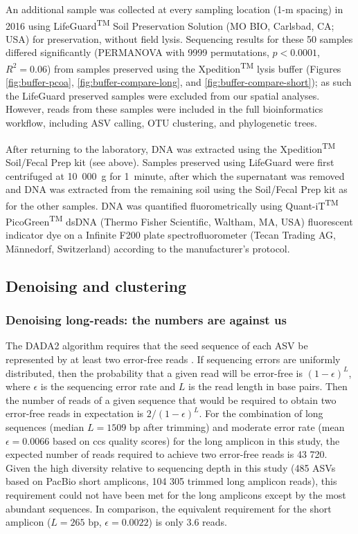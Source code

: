 \documentclass[
]{article}
\begin{document}
An additional sample was collected at every sampling location (1-m spacing) in 2016 using LifeGuard\textsuperscript{TM} Soil Preservation Solution (MO BIO, Carlsbad, CA; USA) for preservation, without field lysis.
Sequencing results for these 50 samples differed significantly (PERMANOVA with 9999 permutations, \(p < 0.0001\), \(R^2 = 0.06\)) from samples preserved using the Xpedition\textsuperscript{TM} lysis buffer (Figures \ref{fig:buffer-pcoa}, \ref{fig:buffer-compare-long}, and \ref{fig:buffer-compare-short}); as such the LifeGuard preserved samples were excluded from our spatial analyses.
However, reads from these samples were included in the full bioinformatics workflow, including ASV calling, OTU clustering, and phylogenetic trees.

After returning to the laboratory, DNA was extracted using the Xpedition\textsuperscript{TM} Soil/Fecal Prep kit (see above).
Samples preserved using LifeGuard were first centrifuged at 10~000~g for 1~minute, after which the supernatant was removed and DNA was extracted from the remaining soil using the Soil/Fecal Prep kit as for the other samples.
DNA was quantified fluorometrically using Quant-iT\textsuperscript{TM} PicoGreen\textsuperscript{TM} dsDNA (Thermo Fisher Scientific, Waltham, MA, USA) fluorescent indicator dye on a Infinite F200 plate spectrofluorometer (Tecan Trading AG, Männedorf, Switzerland) according to the manufacturer's protocol.

\hypertarget{denoising-supplement}{%
\subsection{Denoising and clustering}\label{denoising-supplement}}

\hypertarget{long-numbers}{%
\subsubsection{Denoising long-reads: the numbers are against us}\label{long-numbers}}

The DADA2 algorithm requires that the seed sequence of each ASV be represented by at least two error-free reads \autocite{callahan2016}.
If sequencing errors are uniformly distributed, then the probability that a given read will be error-free is \((1-\epsilon)^L\), where \(\epsilon\) is the sequencing error rate and \(L\) is the read length in base pairs.
Then the number of reads of a given sequence that would be required to obtain two error-free reads in expectation is \(2/(1-\epsilon)^L\).
For the combination of long sequences (median \(L=1509 \text{ bp}\) after trimming) and moderate error rate (mean \(\epsilon= 0.0066\) based on ccs quality scores) for the long amplicon in this study, the expected number of reads required to achieve two error-free reads is 43 720.
Given the high diversity relative to sequencing depth in this study (485 ASVs based on PacBio short amplicons, 104 305 trimmed long amplicon reads), this requirement could not have been met for the long amplicons except by the most abundant sequences.
In comparison, the equivalent requirement for the short amplicon (\(L=265 \text{ bp}\), \(\epsilon=0.0022\)) is only 3.6 reads.
\end{document}
